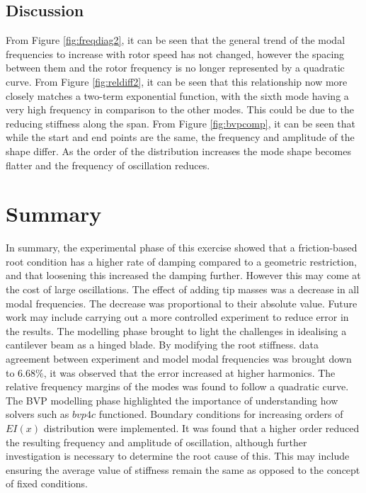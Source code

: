 \documentclass[11pt]{article}
\begin{document}
\subsection{Discussion}
From Figure \ref{fig:freqdiag2}, it can be seen that the general trend of the modal frequencies to increase with rotor speed has not changed, however the spacing between them and the rotor frequency is no longer represented by a quadratic curve. From Figure \ref{fig:reldiff2}, it can be seen that this relationship now more closely matches a two-term exponential function, with the sixth mode having a very high frequency in comparison to the other modes. This could be due to the reducing stiffness along the span.
From Figure \ref{fig:bvpcomp}, it can be seen that while the start and end points are the same, the frequency and amplitude of the shape differ. As the order of the distribution increases the mode shape becomes flatter and the frequency of oscillation reduces.
\section{Summary}
In summary, the experimental phase of this exercise showed that a friction-based root condition has a higher rate of damping compared to a geometric restriction, and that loosening this increased the damping further. However this may come at the cost of large oscillations. The effect of adding tip masses was a decrease in all modal frequencies. The decrease was proportional to their absolute value. Future work may include carrying out a more controlled experiment to reduce error in the results.
The modelling phase brought to light the challenges in idealising a cantilever beam as a hinged blade. By modifying the root stiffness. data agreement between experiment and model modal frequencies was brought down to $6.68\%$, it was observed that the error increased at higher harmonics. The relative frequency margins of the modes was found to follow a quadratic curve. The BVP modelling phase highlighted the importance of understanding how solvers such as $bvp4c$ functioned. Boundary conditions for increasing orders of $EI(x)$ distribution were implemented. It was found that a higher order reduced the resulting frequency and amplitude of oscillation, although further investigation is necessary to determine the root cause of this. This may include ensuring the average value of stiffness remain the same as opposed to the concept of fixed conditions. 
\end{document}
